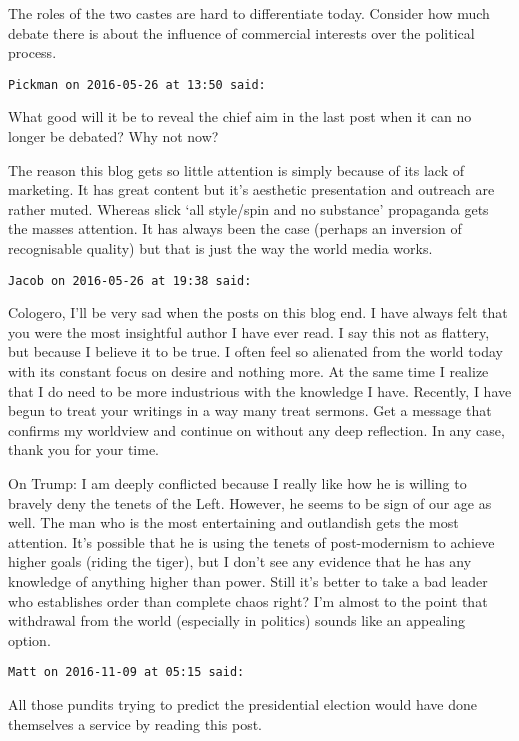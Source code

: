 \begin{footnotesize}
\begin{sffamily}
The roles of the two castes are hard to differentiate today. Consider how much debate there is about the influence of commercial interests over the political process.


\hfill

\texttt{Pickman on 2016-05-26 at 13:50 said: }

What good will it be to reveal the chief aim in the last post when it can no longer be debated? Why not now?

The reason this blog gets so little attention is simply because of its lack of marketing. It has great content but it's aesthetic presentation and outreach are rather muted. Whereas slick `all style/spin and no substance' propaganda gets the masses attention. It has always been the case (perhaps an inversion of recognisable quality) but that is just the way the world media works.


\hfill

\texttt{Jacob on 2016-05-26 at 19:38 said: }

Cologero, I'll be very sad when the posts on this blog end. I have always felt that you were the most insightful author I have ever read. I say this not as flattery, but because I believe it to be true. I often feel so alienated from the world today with its constant focus on desire and nothing more. At the same time I realize that I do need to be more industrious with the knowledge I have. Recently, I have begun to treat your writings in a way many treat sermons. Get a message that confirms my worldview and continue on without any deep reflection. In any case, thank you for your time. 

On Trump: I am deeply conflicted because I really like how he is willing to bravely deny the tenets of the Left. However, he seems to be sign of our age as well. The man who is the most entertaining and outlandish gets the most attention. It's possible that he is using the tenets of post-modernism to achieve higher goals (riding the tiger), but I don't see any evidence that he has any knowledge of anything higher than power. Still it's better to take a bad leader who establishes order than complete chaos right? I'm almost to the point that withdrawal from the world (especially in politics) sounds like an appealing option.


\hfill

\texttt{Matt on 2016-11-09 at 05:15 said: }

All those pundits trying to predict the presidential election would have done themselves a service by reading this post.


\hfill


\end{sffamily}\end{footnotesize}
